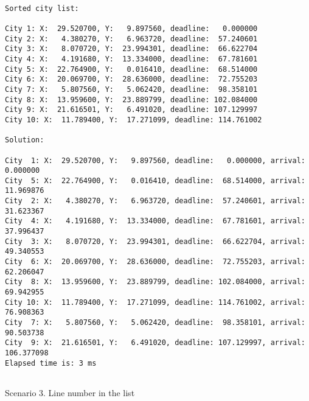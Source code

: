 \documentclass[a4paper, 12pt]{article}
\begin{document}
\begin{lstlisting}

Sorted city list:

City 1: X:  29.520700, Y:   9.897560, deadline:   0.000000
City 2: X:   4.380270, Y:   6.963720, deadline:  57.240601
City 3: X:   8.070720, Y:  23.994301, deadline:  66.622704
City 4: X:   4.191680, Y:  13.334000, deadline:  67.781601
City 5: X:  22.764900, Y:   0.016410, deadline:  68.514000
City 6: X:  20.069700, Y:  28.636000, deadline:  72.755203
City 7: X:   5.807560, Y:   5.062420, deadline:  98.358101
City 8: X:  13.959600, Y:  23.889799, deadline: 102.084000
City 9: X:  21.616501, Y:   6.491020, deadline: 107.129997
City 10: X:  11.789400, Y:  17.271099, deadline: 114.761002

Solution: 

City  1: X:  29.520700, Y:   9.897560, deadline:   0.000000, arrival:   0.000000
City  5: X:  22.764900, Y:   0.016410, deadline:  68.514000, arrival:  11.969876
City  2: X:   4.380270, Y:   6.963720, deadline:  57.240601, arrival:  31.623367
City  4: X:   4.191680, Y:  13.334000, deadline:  67.781601, arrival:  37.996437
City  3: X:   8.070720, Y:  23.994301, deadline:  66.622704, arrival:  49.340553
City  6: X:  20.069700, Y:  28.636000, deadline:  72.755203, arrival:  62.206047
City  8: X:  13.959600, Y:  23.889799, deadline: 102.084000, arrival:  69.942955
City 10: X:  11.789400, Y:  17.271099, deadline: 114.761002, arrival:  76.908363
City  7: X:   5.807560, Y:   5.062420, deadline:  98.358101, arrival:  90.503738
City  9: X:  21.616501, Y:   6.491020, deadline: 107.129997, arrival: 106.377098
Elapsed time is: 3 ms


\end{lstlisting}


Scenario 3. Line number in the list
\end{document}
